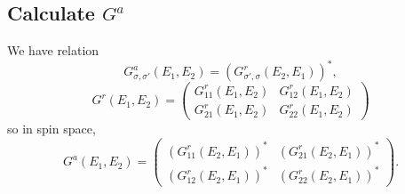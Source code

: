 \documentclass[11pt,a4paper]{article}
\begin{document}
\subsection{Calculate $G^{a}$}
We have relation
\begin{equation}
G_{\sigma,\sigma'}^{a}\left(E_{1}, E_{2}\right)=(G_{\sigma',\sigma}^{r}\left(E_{2}, E_{1}\right))^{*},
\end{equation}
\begin{equation}
G^{r}(E_{1},E_{2})=\left(\begin{array}{cc}
G_{11}^{r}(E_{1},E_{2}) & G_{12}^{r}(E_{1},E_{2}) \\
G_{21}^{r}(E_{1},E_{2}) & G_{22}^{r}(E_{1},E_{2})
\end{array}\right)
\end{equation}
so in spin space, 
\begin{equation}
G^{a}(E_{1},E_{2})=\left(\begin{array}{cc}
(G_{11}^{r}(E_{2},E_{1}))^{*} & (G_{21}^{r}(E_{2},E_{1}))^{*} \\
(G_{12}^{r}(E_{2},E_{1}))^{*} & (G_{22}^{r}(E_{2},E_{1}))^{*}
\end{array}\right).
\end{equation}
\end{document}
